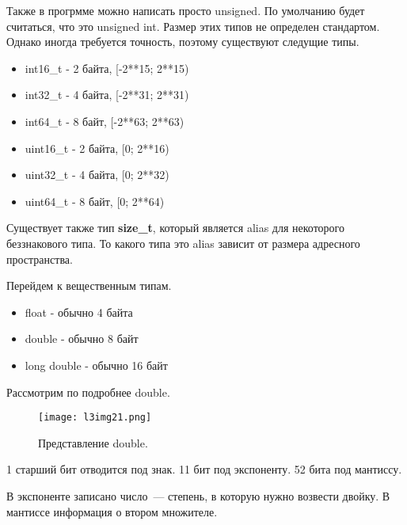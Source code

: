 Также в прогрмме можно написать просто unsigned. По умолчанию будет считаться, что это unsigned int.
Размер этих типов не определен стандартом. Однако иногда требуется точность, поэтому существуют следущие типы.

\begin{itemize}
    \item int16\_t -  2 байта, [-2**15; 2**15)
    \item int32\_t -  4 байта, [-2**31; 2**31)
    \item int64\_t -  8 байт, [-2**63; 2**63)
    \item uint16\_t - 2 байта, [0; 2**16)
    \item uint32\_t - 4 байта, [0; 2**32)
    \item uint64\_t - 8 байт, [0; 2**64)
\end{itemize}

Существует также тип \textbf{size\_t}, который является alias для некоторого беззнакового типа.
То какого типа это alias зависит от размера адресного пространства.

Перейдем к вещественным типам.

\begin{itemize}
    \item float - обычно 4 байта
    \item double - обычно 8 байт
    \item long double - обычно 16 байт
\end{itemize}

Рассмотрим по подробнее double.

\begin{figure}[h]
    \centering
    \texttt{[image: l3img21.png]}
    \caption{Представление double.}
    \label{l3img21}
\end{figure}

1 старший бит отводится под знак. 11 бит под экспоненту.
52 бита под мантиссу.

В экспоненте записано число~--- степень, в которую нужно возвести двойку.
В мантиссе информация о втором множителе.
